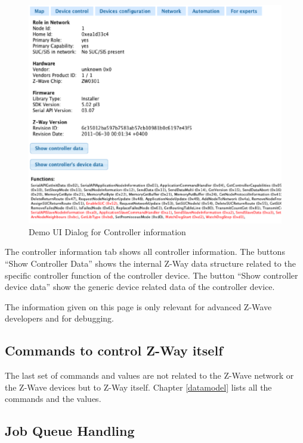 \begin{figure} 
\begin{center}
\includegraphics[scale=0.8]{pics/controllerstatus.png}
\caption{Demo UI Dialog for Controller information}
\label{c4:democontroller} 
\end{center}
 \end{figure}
  
The controller information tab shows all controller information. The buttons “Show Controller Data” shows the 
internal Z-Way data structure related to the specific controller function of the controller device. The button 
“Show controller device data” show the generic device related data of the controller device.

The information given on this page is only relevant for advanced Z-Wave developers and for debugging.

\subsection{Commands to control Z-Way itself} 
 
The last set of commands and values are not related to the Z-Wave network or the Z-Wave devices but to Z-Way itself.  
Chapter \ref{datamodel} lists all the commands and the values.

\subsection{Job Queue Handling}

